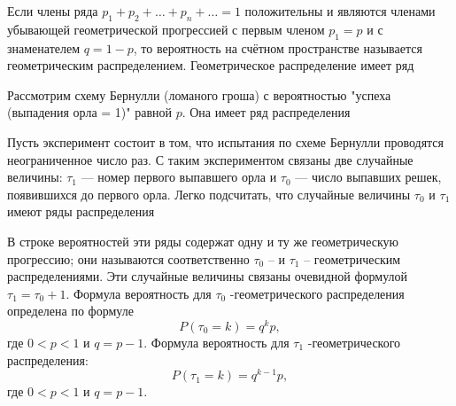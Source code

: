 \begin{definition}
Если члены ряда $p_1 + p_2 + \ldots + p_n + \ldots = 1$ положительны и являются членами убывающей геометрической прогрессией с первым членом $p_1 = p$ и с знаменателем $q = 1 − p$, то вероятность на счётном пространстве называется геометрическим распределением. Геометрическое распределение имеет ряд

\begin{table}
\end{table}



\end{definition}

\begin{example}
Рассмотрим схему Бернулли (ломаного гроша) с вероятностью "успеха (выпадения орла = 1)" равной $p$. Она имеет ряд распределения

\begin{table}
\end{table}

Пусть эксперимент состоит в том, что испытания по схеме Бернулли проводятся неограниченное число раз. С таким экспериментом связаны две случайные величины: $\tau_1$ — номер первого выпавшего орла и $\tau_0$ — число выпавших решек, появившихся до первого орла. Легко подсчитать, что случайные величины $\tau_0$ и $\tau_1$ имеют ряды распределения

\begin{table}
\end{table}








В строке вероятностей эти ряды содержат одну и ту же геометрическую
прогрессию; они называются соответственно $\tau_0$ -- и $\tau_1$ -- геометрическим распределениями. Эти случайные величины связаны очевидной формулой $\tau_1 = \tau_0 + 1$.
Формула вероятность для $\tau_0$ -геометрического распределения определена по формуле
$$P(\tau_0 = k) = q^k p,$$
где $0 < p < 1$ и $q = p − 1$.
Формула вероятность для $\tau_1$ -геометрического распределения:
$$P(\tau_1 = k) = q^{k−1} p,$$
где $0 < p < 1$ и $q = p − 1.$
\end{example}

